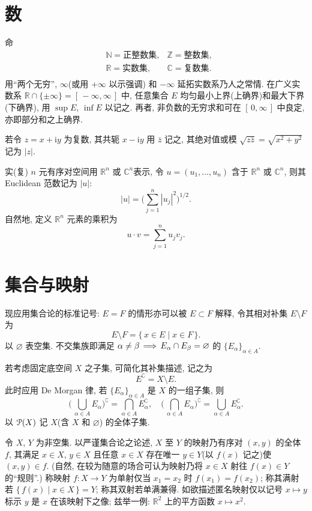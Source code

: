 \documentclass[twoside, fontset=fandol, punct=kaiming]{ctexbook}
\renewcommand\implies{\DOTSB \,\Longrightarrow \,}
\let \mathcal \EuScript
\theoremstyle{innocent}
\begin{document}
\section{数}
命
\[
    \begin{aligned}
         & \mathbb N  =\textit{正整数集},
         & \mathbb Z  =\textit{整数集},   \\
         & \mathbb R  =\textit{实数集},
         & \mathbb C  =\textit{复数集}.   \\
    \end{aligned}
\]
用``两个无穷'', $\infty$(或用 $+\infty$ 以示强调) 和 $-\infty$ 延拓实数系乃人之常情. 在广义实数系 $\mathbb R\cap\{\pm\infty\}=[\,-\infty,\infty\,]$ 中, 任意集合 $E$ 均匀最小上界(上确界)和最大下界(下确界), 用 $\sup E$, $\inf E$ 以记之. 再者, 非负数的无穷求和可在 $[\,0,\infty\,]$ 中良定, 亦即部分和之上确界.

若令 $z=x+\mathrm iy$ 为复数, 其共轭 $x-\mathrm iy$ 用 $\bar z$ 记之, 其绝对值或模 $\sqrt{z\bar z} = \sqrt{x^2 + y^2}$ 记为 $|z|$.

实(复) $n$ 元有序对空间用 $\mathbb R^n$ 或 $\mathbb C^n$表示, 令 $u=(u_1,\dots,u_n)$ 含于 $\mathbb R^n$ 或 $\mathbb C^n$, 则其 Euclidean 范数记为 $|u|$:
\[
    |u| = \biggl( \sum_{j=1}^n |u_j|^2 \biggr) ^{1 /2}
    .\]
自然地, 定义 $\mathbb R^n$ 元素的乘积为
\[
    u\cdot v=\sum_{j=1}^n u_j v_j
    .\]
\section{集合与映射}
现应用集合论的标准记号: $E=F$ 的情形亦可以被 $E\subset F$ 解释, 令其相对补集 $E\setminus F$ 为
\[
    E\setminus F = \{\, x\in E \mid x\in F \,\}.
\]
以 $\varnothing$ 表空集. 不交集族即满足 $\alpha \neq \beta \implies E_\alpha\cap E_ \beta =\varnothing$ 的 $\{E_\alpha\}_{\alpha\in A}$.

若考虑固定底空间 $X$ 之子集, 可简化其补集描述, 记之为
\[
    E^\complement  = X\setminus E.
\]
此时应用 De Morgan 律, 若 $\{E_\alpha\}_{\alpha\in A}$ 是 $X$ 的一组子集, 则
\[
    \biggl(\, \bigcup_{\alpha\in A}E_\alpha \biggr)^\complement = \bigcap_{\alpha\in A}E_\alpha^\complement,\quad\biggl(\, \bigcap_{\alpha\in A}E_\alpha \biggr)^\complement = \bigcup_{\alpha\in A}E_\alpha^\complement.
\]
以 $\mathcal P(X)$ 记 $X$(含 $X$ 和 $\varnothing$) 的全体子集.

令 $X$, $Y$ 为非空集. 以严谨集合论之论述, $X$ 至 $Y$ 的映射乃有序对 $(x,y)$ 的全体 $f$, 其满足 $x\in X$, $y\in X$ 且任意 $x\in X$ 存在唯一 $y\in Y$(以 $f(x)$ 记之)使 $(x,y)\in f$. (自然, 在较为随意的场合可认为映射乃将 $x\in X$ 射往 $f(x)\in Y$ 的``规则''.) 称映射 $f:X\to Y$ 为单射仅当 $x_1=x_2$ 时 $f(x_1)=f(x_2)$; 称其满射若 $\{\,f(x)\mid x\in X\,\}=Y$; 称其双射若单满兼得. 如欲描述匿名映射仅以记号 $x\mapsto y$ 标示 $y$ 是 $x$ 在该映射下之像; 兹举一例: $\mathbb R^2$ 上的平方函数 $x\mapsto x^2$.
\end{document}
